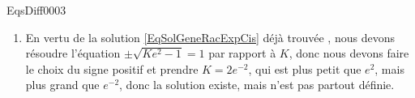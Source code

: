 \begin{corrige}{EqsDiff0003}
\begin{enumerate}
\item
En vertu de la solution \eqref{EqSolGeneRacExpCis} déjà trouvée , nous devons résoudre l'équation $\pm\sqrt{K e^{2}-1}=1$ par rapport à $K$, donc nous devons faire le choix du signe positif et prendre $K=2 e^{-2}$, qui est plus petit que $e^2$, mais plus grand que $e^{-2}$, donc la solution existe, mais n'est pas partout définie.

\end{enumerate}

\end{corrige}
